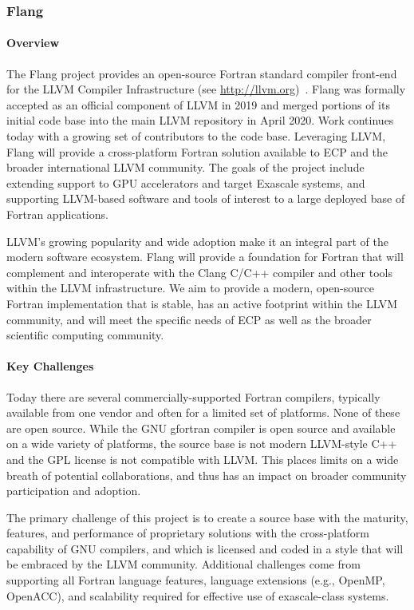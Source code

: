 \subsubsection{ Flang}\label{subsubsect:flang}

\paragraph{Overview}

The Flang project provides an open-source Fortran standard 
\cite{iso-fortran-2004, iso-fortran-2010, iso-fortran-2018}
compiler front-end for the LLVM Compiler Infrastructure (see
\url{http://llvm.org})~\cite{llvm:homepage}.  Flang was formally
accepted as an official component of LLVM in 2019 and merged portions
of its initial code base into the main LLVM repository in April 2020. 
Work continues today with a growing set of contributors to the
code base.  Leveraging LLVM, Flang will provide a
cross-platform Fortran solution available to ECP and the broader
international LLVM community. The goals of the project include
extending support to GPU accelerators and target Exascale systems, and
supporting LLVM-based software and tools of interest to a large
deployed base of Fortran applications.

LLVM's growing popularity and wide adoption make it an integral part
of the modern software ecosystem. Flang will provide a foundation
for Fortran that will complement and interoperate with the
Clang C/C++ compiler and other tools within the LLVM infrastructure.
We aim to provide a modern, open-source Fortran implementation that is
stable, has an active footprint within the LLVM community, and will
meet the specific needs of ECP as well as the broader scientific
computing community.

\paragraph{Key Challenges}
Today there are several commercially-supported Fortran compilers,
typically available from one vendor and often for a limited set of
platforms.  None of these are open source.  While the GNU gfortran compiler is
open source and available on a wide variety of platforms, the source base is not modern
LLVM-style C++ and the GPL license is not compatible with
LLVM.  This places limits on a wide breath of potential collaborations, and thus has an
impact on broader community participation and adoption.

The primary challenge of this project is to create a source base with
the maturity, features, and performance of proprietary solutions with
the cross-platform capability of GNU compilers, and which is licensed
and coded in a style that will be embraced by the LLVM community. 
Additional challenges come from supporting all Fortran
language features, language extensions (e.g., OpenMP, OpenACC), and
scalability required for effective use of exascale-class systems. 

